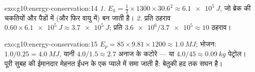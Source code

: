 \begin{solution}{exo:g10:energy-conservation:14}
\emph{1.} $E_k = \tfrac12 \times 1300 \times 30.6^2 \approx
\qty{6.1e5}{J}$, जो ब्रेक की चकतियों और पैडों में (और फिर वायु में)
 बन जाती है।
\emph{2.} प्रति ठहराव $0.60 \times \qty{6.1e5}{J} \approx \qty{3.7e5}{J}$; प्रति  $\num{3.6e6}/\num{3.7e5} \approx 10$ ठहराव।
\end{solution}

\begin{solution}{exo:g10:energy-conservation:15}
$E_p = 85 \times 9.81 \times 1200 \approx \qty{1.0}{MJ}$; भोजन: $1.0/0.25 = \qty{4.0}{MJ}$, यानी $4.0/1.5 \approx 2.7$ अनाज के कटोरे --- या $4.0/45 \approx \qty{0.09}{kg}$ पेट्रोल।
पूरी सुबह की ईमानदार मेहनत ईंधन के एक प्याले में समा जाती है:
 बेतुकी हद तक सघन है।
\end{solution}

